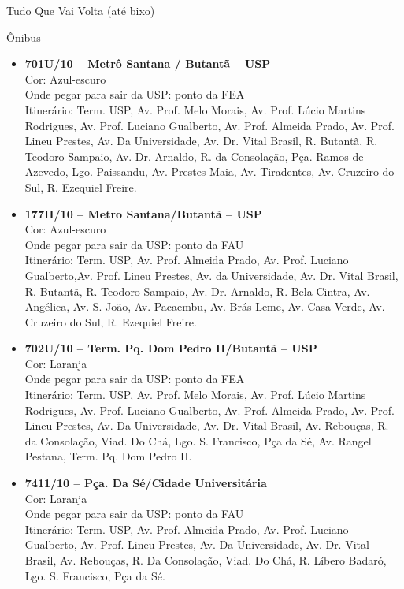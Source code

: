 \begin{secao}{Tudo Que Vai Volta (até bixo)}
\begin{subsecao}{Ônibus}
\begin{itemize}
	\item {\bf 701U/10 – Metrô Santana / Butantã – USP}\\
    	Cor: Azul-escuro\\
		Onde pegar para sair da USP: ponto da FEA\\
		Itinerário: Term. USP, Av. Prof. Melo Morais, Av. Prof. Lúcio Martins
		Rodrigues, Av. Prof. Luciano Gualberto, Av. Prof. Almeida Prado, Av. 
		Prof. Lineu Prestes, Av. Da Universidade, Av. Dr. Vital Brasil, R. 
		Butantã, R. Teodoro Sampaio, Av. Dr. Arnaldo, R. da Consolação, Pça.
		Ramos de Azevedo, Lgo. Paissandu, Av. Prestes Maia, Av. Tiradentes, Av.
		Cruzeiro do Sul, R. Ezequiel Freire.

	\item {\bf 177H/10 – Metro Santana/Butantã – USP}\\
	Cor: Azul-escuro\\
	Onde pegar para sair da USP: ponto da FAU\\
	Itinerário: Term. USP, Av. Prof. Almeida Prado, Av. Prof. Luciano 
	Gualberto,Av. Prof. Lineu Prestes, Av. da Universidade, Av. Dr. Vital
	Brasil, R. Butantã, R. Teodoro Sampaio, Av. Dr. Arnaldo, R. Bela Cintra,
	Av. Angélica, Av. S. João, Av. Pacaembu, Av. Brás Leme, Av. Casa Verde,
	Av. Cruzeiro do Sul, R. Ezequiel Freire.

	\item {\bf 702U/10 – Term. Pq. Dom Pedro II/Butantã – USP}\\
	Cor: Laranja\\
	Onde pegar para sair da USP: ponto da FEA\\
	Itinerário: Term. USP, Av. Prof. Melo Morais, Av. Prof. Lúcio Martins
	Rodrigues, Av. Prof. Luciano Gualberto, Av. Prof. Almeida Prado, Av. Prof.
	Lineu Prestes, Av. Da Universidade, Av.	Dr. Vital Brasil, Av. Rebouças, R.
	da Consolação, Viad. Do Chá, Lgo. S. Francisco, Pça da Sé, Av. Rangel 
	Pestana, Term. Pq. Dom Pedro II.

	\item {\bf 7411/10 – Pça. Da Sé/Cidade Universitária}\\
	Cor: Laranja\\
	Onde pegar para sair da USP: ponto da FAU\\
	Itinerário: Term. USP, Av. Prof. Almeida Prado, Av. Prof. Luciano 
	Gualberto, Av. Prof. Lineu Prestes, Av. Da Universidade, Av. Dr. Vital 
	Brasil, Av. Rebouças, R. Da Consolação, Viad. Do Chá, R. Líbero Badaró,
	Lgo. S. Francisco, Pça da Sé.


\end{itemize}
\end{subsecao}
\end{secao}
